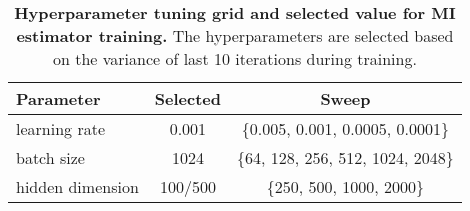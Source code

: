 \begin{table}[h]\caption{\textbf{Hyperparameter tuning grid and selected value for MI estimator training.} The hyperparameters are selected based on the variance of last 10 iterations during training.}
\centering
\begin{tabular}{@{}lcc@{}}
\toprule
Parameter        & Selected & Sweep                                              \\ \midrule
learning rate    & 0.001    & \{0.005, 0.001, 0.0005, 0.0001\} \\
batch size       & 1024     & \{64, 128, 256, 512, 1024, 2048\}                  \\
hidden dimension & 100/500  & \{250, 500, 1000, 2000\}                      \\ \bottomrule
\end{tabular} \label{tab:mi_hyperparameter}
\end{table}